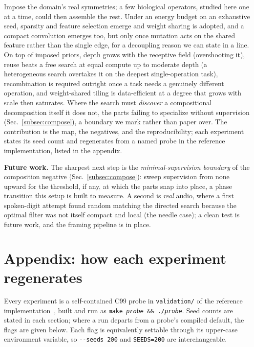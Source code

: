 \documentclass[11pt]{article}
\begin{document}
Impose the domain's real symmetries; a few biological operators, studied here one at a time, could then
assemble the rest. Under an energy
budget on an exhaustive seed, sparsity and feature selection emerge and weight sharing is adopted, and a
compact convolution emerges too, but only once mutation acts on the shared feature rather than the single
edge, for a decoupling reason we can state in a line. On top of imposed priors,
depth grows with the receptive field (overshooting it), reuse beats a free search at equal compute up to
moderate depth (a heterogeneous search overtakes it on the deepest single-operation task), recombination is
required outright once a task needs a genuinely different operation, and weight-shared tiling is
data-efficient at a degree that grows with scale then saturates. Where the search must \emph{discover} a
compositional decomposition itself it does not, the parts failing to specialize without supervision
(Sec.~\ref{subsec:compose}), a boundary we mark rather than paper over. The contribution is the map, the negatives, and
the reproducibility; each experiment states its seed count and regenerates from a named probe in the
reference implementation, listed in the appendix.

\textbf{Future work.} The sharpest next step is the \emph{minimal-supervision boundary} of the composition
negative (Sec.~\ref{subsec:compose}): sweep supervision from none upward for the threshold, if any, at which
the parts snap into place, a phase transition this setup is built to measure. A second is \emph{real} audio,
where a first spoken-digit attempt found random matching the directed search because the optimal filter was
not itself compact and local (the needle case); a clean test is future work, and the framing pipeline is in
place.

\section*{Appendix: how each experiment regenerates}

Every experiment is a self-contained C99 probe in \texttt{validation/} of the reference
implementation~\cite{repo}, built and run as \texttt{make \emph{probe} \&\& ./\emph{probe}}. Seed counts
are stated in each section; where a run departs from a probe's compiled default, the flags are given
below. Each flag is equivalently settable through its upper-case environment variable, so
\texttt{-{}-seeds 200} and \texttt{SEEDS=200} are interchangeable.
\end{document}
